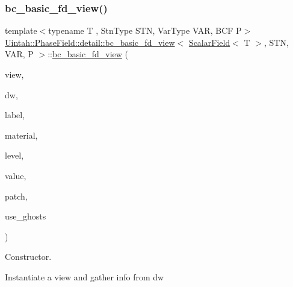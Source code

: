 \subsubsection{\texorpdfstring{bc\+\_\+basic\+\_\+fd\+\_\+view()}{bc\_basic\_fd\_view()}\hspace{0.1cm}{\footnotesize\ttfamily [3/4]}}
{\footnotesize\ttfamily template$<$typename T , Stn\+Type S\+TN, Var\+Type V\+AR, B\+CF P$>$ \\
\hyperlink{classUintah_1_1PhaseField_1_1detail_1_1bc__basic__fd__view}{Uintah\+::\+Phase\+Field\+::detail\+::bc\+\_\+basic\+\_\+fd\+\_\+view}$<$ \hyperlink{structUintah_1_1PhaseField_1_1ScalarField}{Scalar\+Field}$<$ T $>$, S\+TN, V\+AR, P $>$\+::\hyperlink{classUintah_1_1PhaseField_1_1detail_1_1bc__basic__fd__view}{bc\+\_\+basic\+\_\+fd\+\_\+view} (\begin{DoxyParamCaption}\item[{const \hyperlink{classUintah_1_1PhaseField_1_1detail_1_1view}{view}$<$ \hyperlink{structUintah_1_1PhaseField_1_1ScalarField}{Field} $>$ $\ast$}]{view,  }\item[{Data\+Warehouse $\ast$}]{dw,  }\item[{const Var\+Label $\ast$}]{label,  }\item[{int}]{material,  }\item[{const Level $\ast$}]{level,  }\item[{const BV \&}]{value,  }\item[{const Patch $\ast$}]{patch,  }\item[{bool}]{use\+\_\+ghosts }\end{DoxyParamCaption})\hspace{0.3cm}{\ttfamily [inline]}}



Constructor. 

Instantiate a view and gather info from dw


